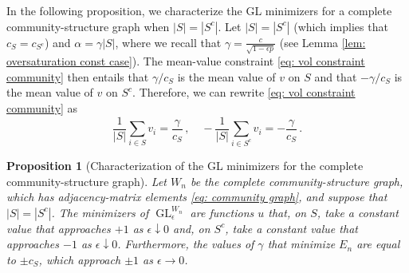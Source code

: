 \documentclass[11pt]{amsart}
\newtheorem{proposition}{Proposition}[section]
\def\ep{\epsilon}
\def\ra{\rightarrow}
\def\GL{\operatorname{GL}}
\numberwithin{equation}{section}
\begin{document}
In the following proposition, we characterize the GL minimizers {for} a complete community-structure graph when $|S| = |S^c|$. 
Let $|S| = |S^c|$ (which implies that $c_S = c_{S^c}$) {and $\alpha = \gamma |S|$, where we recall that $\gamma = \frac{c}{\sqrt{1 - \ep p}}$ (see Lemma \ref{lem: oversaturation const case}).}
The {mean-value constraint} \eqref{eq: vol constraint community} then entails that ${\gamma}/{c_S}$ is the mean value of $v$ on $S$ and that $-{\gamma}/{c_S}$ is the mean value of $v$ on $S^c$. Therefore, we can rewrite \eqref{eq: vol constraint community} as 
\begin{equation}\label{eq: equal community vol constraint}
    \frac{1}{|S|} \sum_{i\in S} v_i = \frac{\gamma}{c_S}\,, \quad  -\frac{1}{|S|} \sum_{i\in S^c} v_i = -\frac{\gamma}{c_S}\,.
\end{equation}

\begin{proposition}[Characterization of the GL minimizers for the complete community-structure graph] \label{prop: community structure minimizers}
Let $W_n$ be the complete community-structure graph, which has adjacency-matrix elements \eqref{eq: community graph}, and suppose that $|S| = |S^c|$. 
The minimizers of $\GL^{W_n}_\ep$ are functions $u$ that, on $S$, take a constant value that approaches $+1$ as $\ep \downarrow 0$ and, on $S^c$, take a constant value that approaches $-1$ as $\ep \downarrow 0$. Furthermore, the values of $\gamma$ that minimize $E_n$ {are equal to} $\pm c_S$, which approach $\pm 1$ as $\ep \ra 0$.
\end{proposition}
\end{document}
